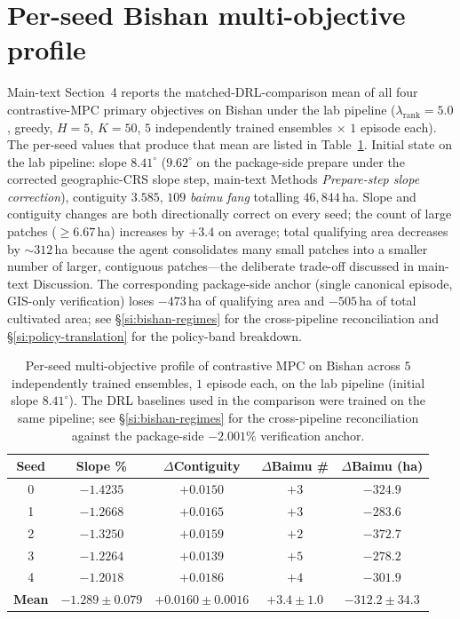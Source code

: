 \documentclass[11pt]{article}
\begin{document}


\section{Per-seed Bishan multi-objective profile}\label{si:contrastive-multiobj}

Main-text Section~4 reports the matched-DRL-comparison mean of all four contrastive-MPC primary objectives on Bishan under the lab pipeline ($\lambda_{\text{rank}}{=}5.0$, greedy, $H{=}5$, $K{=}50$, $5$ independently trained ensembles $\times$ $1$ episode each). The per-seed values that produce that mean are listed in Table~\ref{tab:si-contrastive-multiobj}. Initial state on the lab pipeline: slope $8.41^{\circ}$ ($9.62^{\circ}$ on the package-side prepare under the corrected geographic-CRS slope step, main-text Methods \emph{Prepare-step slope correction}), contiguity $3.585$, $109$ \textit{baimu fang} totalling $46{,}844$\,ha. Slope and contiguity changes are both directionally correct on every seed; the count of large patches ($\geq 6.67$\,ha) increases by $+3.4$ on average; total qualifying area decreases by $\sim$$312$\,ha because the agent consolidates many small patches into a smaller number of larger, contiguous patches---the deliberate trade-off discussed in main-text Discussion. The corresponding package-side anchor (single canonical episode, GIS-only verification) loses $-473$\,ha of qualifying area and $-505$\,ha of total cultivated area; see \S\ref{si:bishan-regimes} for the cross-pipeline reconciliation and \S\ref{si:policy-translation} for the policy-band breakdown.

\begin{table}[htbp]
\centering
\small
\caption{Per-seed multi-objective profile of contrastive MPC on Bishan across $5$ independently trained ensembles, $1$ episode each, on the lab pipeline (initial slope $8.41^{\circ}$). The DRL baselines used in the comparison were trained on the same pipeline; see \S\ref{si:bishan-regimes} for the cross-pipeline reconciliation against the package-side $-2.001\%$ verification anchor.}
\label{tab:si-contrastive-multiobj}
\begin{tabular}{ccccc}
\toprule
Seed & Slope \% & $\Delta$Contiguity & $\Delta$Baimu \# & $\Delta$Baimu (ha) \\
\midrule
0 & $-1.4235$ & $+0.0150$ & $+3$ & $-324.9$ \\
1 & $-1.2668$ & $+0.0165$ & $+3$ & $-283.6$ \\
2 & $-1.3250$ & $+0.0159$ & $+2$ & $-372.7$ \\
3 & $-1.2264$ & $+0.0139$ & $+5$ & $-278.2$ \\
4 & $-1.2018$ & $+0.0186$ & $+4$ & $-301.9$ \\
\midrule
\textbf{Mean} & $\mathbf{-1.289 \pm 0.079}$ & $\mathbf{+0.0160 \pm 0.0016}$ & $\mathbf{+3.4 \pm 1.0}$ & $\mathbf{-312.2 \pm 34.3}$ \\
\bottomrule
\end{tabular}
\end{table}
\end{document}

